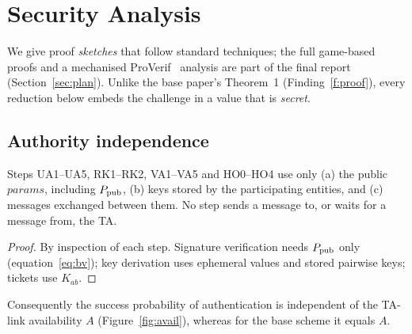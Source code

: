 \section{Security Analysis}\label{sec:security}
We give proof \emph{sketches} that follow standard techniques; the full game-based proofs and a mechanised ProVerif~\cite{proverif} analysis are part of the
final report (Section~\ref{sec:plan}). Unlike the base paper's Theorem~1 (Finding~\ref{f:proof}), every reduction below embeds the challenge in a value that
is \emph{secret}.

\subsection{Authority independence}
\begin{proposition}[No online TA]\label{prop:indep}
Steps UA1--UA5, RK1--RK2, VA1--VA5 and HO0--HO4 use only (a) the public $\mathit{params}$, including $P_{\mathrm{pub}}$, (b) keys stored by the participating
entities, and (c) messages exchanged between them. No step sends a message to, or waits for a message from, the TA.
\end{proposition}
\begin{proof}
By inspection of each step. Signature verification needs $P_{\mathrm{pub}}$ only (equation~\eqref{eq:bv}); key derivation uses ephemeral values and stored pairwise keys; tickets use $K_{ab}$.
\end{proof}
\noindent Consequently the success probability of authentication is independent of the TA-link availability $A$ (Figure~\ref{fig:avail}), whereas for the base scheme it equals $A$.

